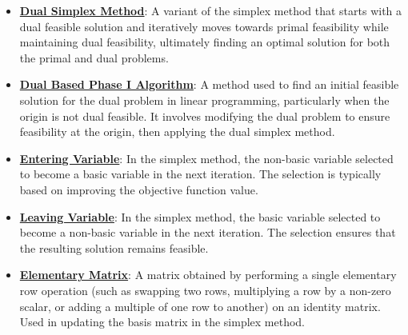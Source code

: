 \documentclass{article}%
\begin{document}
\begin{itemize}[leftmargin=*]%
\item \href{https://www.math.purdue.edu/~yipn/421/2024-10-03-DualSimplexMatrix.pdf#page=2}{\textbf{Dual Simplex Method}}: A variant of the simplex method that starts with a dual feasible solution and iteratively moves towards primal feasibility while maintaining dual feasibility, ultimately finding an optimal solution for both the primal and dual problems.%
\item \href{https://www.math.purdue.edu/~yipn/421/2024-10-03-DualSimplexMatrix.pdf#page=5}{\textbf{Dual Based Phase I Algorithm}}: A method used to find an initial feasible solution for the dual problem in linear programming, particularly when the origin is not dual feasible. It involves modifying the dual problem to ensure feasibility at the origin, then applying the dual simplex method.%
\item \href{https://www.math.purdue.edu/~yipn/421/2024-10-03-DualSimplexMatrix.pdf#page=9}{\textbf{Entering Variable}}: In the simplex method, the non-basic variable selected to become a basic variable in the next iteration. The selection is typically based on improving the objective function value.%
\item \href{https://www.math.purdue.edu/~yipn/421/2024-10-03-DualSimplexMatrix.pdf#page=10}{\textbf{Leaving Variable}}: In the simplex method, the basic variable selected to become a non-basic variable in the next iteration. The selection ensures that the resulting solution remains feasible.%
\item \href{https://www.math.purdue.edu/~yipn/421/2024-10-03-DualSimplexMatrix.pdf#page=15}{\textbf{Elementary Matrix}}: A matrix obtained by performing a single elementary row operation (such as swapping two rows, multiplying a row by a non-zero scalar, or adding a multiple of one row to another) on an identity matrix. Used in updating the basis matrix in the simplex method.%
\end{itemize}%
\end{document}
